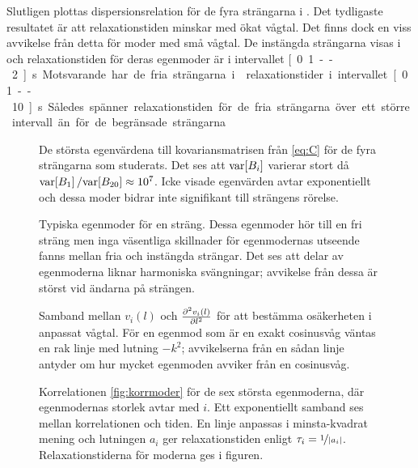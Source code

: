 Slutligen plottas dispersionsrelation för de fyra strängarna i . Det tydligaste resultatet är att relaxationstiden minskar med ökat vågtal. Det finns dock en viss avvikelse från detta för moder med små vågtal. De instängda strängarna visas i  och relaxationstiden för deras egenmoder är i intervallet \unit[0.1--2]{s}. Motsvarande har de fria strängarna i  relaxationstider i intervallet \unit[0.1--10]{s}. Således spänner relaxationstiden för de fria strängarna över ett större intervall än för de begränsade strängarna. 
\begin{figure}
    \centering
    
    \caption{De största egenvärdena till kovariansmatrisen från \eqref{eq:C} för de fyra strängarna som studerats. Det ses att $\text{var}\!\left[B_i\right]$ varierar stort då $\text{var}\!\left[B_1\right]/\text{var}\!\left[B_{20}\right]\approx10^7$. Icke visade egenvärden avtar exponentiellt och dessa moder bidrar inte signifikant till strängens rörelse.}
    \label{fig:kovegenvarde}
\end{figure}
\begin{figure}
    \centering
    
    \caption{Typiska egenmoder för en sträng. Dessa egenmoder hör till en fri sträng men inga väsentliga skillnader för egenmodernas utseende fanns mellan fria och instängda strängar. Det ses att delar av egenmoderna liknar harmoniska svängningar; avvikelse från dessa är störst vid ändarna på strängen.}
    \label{fig:egenmoder}
\end{figure}


\begin{figure}
    \centering
    
    \caption{Samband mellan $v_i(l)$ och $\frac{\partial^2v_i (l)}{\partial l^2}$ för att bestämma osäkerheten i anpassat vågtal. För en egenmod som är en exakt cosinusvåg väntas en rak linje med lutning $-k^2$; avvikelserna från en sådan linje antyder om hur mycket egenmoden avviker från en cosinusvåg.}
    \label{fig:osak_vagtal}
\end{figure}

\begin{figure}
    \centering
    
    \caption{Korrelationen \eqref{fig:korrmoder} för de sex största egenmoderna, där egenmodernas storlek avtar med $i$. Ett exponentiellt samband ses mellan korrelationen och tiden. En linje anpassas i minsta-kvadrat mening och lutningen $a_i$ ger relaxationstiden enligt $\tau_i=\nicefrac{1}{\abs{a_i}}$. Relaxationstiderna för moderna ges i figuren.}
    \label{fig:korrelation}
\end{figure}





